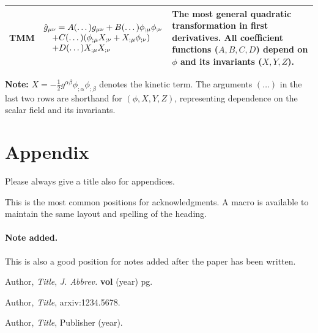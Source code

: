 \documentclass[a4paper,11pt]{article}
\begin{document}
\begin{table}[H]
\begin{tabularx}{\textwidth}{@{} p{4.3cm} p{5.8cm} X @{}}
TMM &
$\begin{array}[t]{@{}l@{}}
\hat{g}_{\mu \nu} = A(\dots) g_{\mu \nu} + B(\dots)\phi_{;\mu}\phi_{;\nu} \\
\quad + C(\dots)(\phi_{;\mu}X_{;\nu}+X_{;\mu}\phi_{;\nu}) \\
\quad + D(\dots)X_{;\mu}X_{;\nu}
\end{array}$ &
The most general quadratic transformation in first derivatives. All coefficient functions ($A, B, C, D$) depend on $\phi$ and its invariants ($X, Y, Z$). \\

\bottomrule
\end{tabularx}

\vspace{1em}
\footnotesize
\textbf{Note:} $X = -\frac{1}{2}g^{\alpha\beta}\phi_{;\alpha}\phi_{;\beta}$ denotes the kinetic term. The arguments $(\dots)$ in the last two rows are shorthand for $(\phi, X, Y, Z)$, representing dependence on the scalar field and its invariants.
\end{table}


\appendix
\section{Appendix} 
Please always give a title also for appendices.








\acknowledgments

This is the most common positions for acknowledgments. A macro is
available to maintain the same layout and spelling of the heading.

\paragraph{Note added.} This is also a good position for notes added
after the paper has been written.






\begin{thebibliography}{99}

Author, \emph{Title}, \emph{J. Abbrev.} {\bf vol} (year) pg.

Author, \emph{Title},
arxiv:1234.5678.

Author, \emph{Title},
Publisher (year).





\end{thebibliography}
\end{document}
